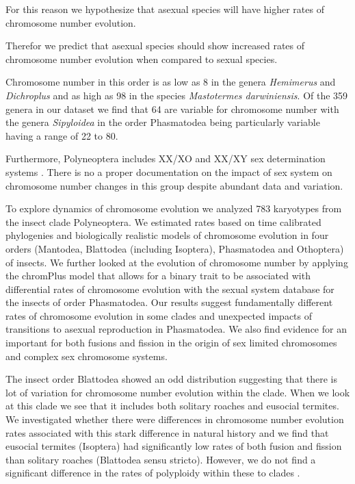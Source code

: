 For this reason we hypothesize that asexual species will have higher rates of chromosome number evolution. 

Therefor we predict that asexual species should show increased rates of chromosome number evolution when compared to sexual species.


Chromosome number in this order is as low as 8 in the genera \textit{Hemimerus} and \textit{Dichroplus} and as high as 98 in the species \textit{Mastotermes darwiniensis}.
Of the 359 genera in our dataset we find that 64 are variable for chromosome number with the genera \textit{Sipyloidea} in the order Phasmatodea being particularly variable having a range of 22 to 80.


Furthermore, Polyneoptera includes XX/XO and XX/XY sex determination systems \citep{blackmon2016}. 
There is no a proper documentation on the impact of sex system on chromosome number changes in this group despite abundant data and variation. 

To explore dynamics of chromosome evolution we analyzed 783 karyotypes from the insect clade Polyneoptera.
We estimated rates based on time calibrated phylogenies and biologically realistic models of chromosome evolution in four orders (Mantodea, Blattodea (including Isoptera), Phasmatodea and Othoptera) of insects.
We further looked at the evolution of chromosome number by applying the chromPlus model that allows for a binary trait to be associated with differential rates of chromosome evolution with the sexual system database for the insects of order Phasmatodea.
Our results suggest fundamentally different rates of chromosome evolution in some clades and unexpected impacts of transitions to asexual reproduction in Phasmatodea. 
We also find evidence for an important for both fusions and fission in the origin of sex limited chromosomes and complex sex chromosome systems.



The insect order Blattodea showed an odd distribution suggesting that there is lot of variation for chromosome number evolution within the clade.
When we look at this clade we see that it includes both solitary roaches and eusocial termites. 
We investigated whether there were differences in chromosome number evolution rates associated with this stark difference in natural history and we find that eusocial termites (Isoptera) had significantly low rates of both fusion and fission than solitary roaches (Blattodea sensu stricto).
However, we do not find a significant difference in the rates of polyploidy within these to clades  .

